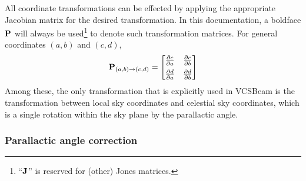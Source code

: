 \documentclass{book}
\newcommand{\vcsbeam}{{\sc VCSBeam}}
\newcommand{\pd}[2]{\ensuremath{\frac{\partial #1}{\partial #2}}}
\newcommand{\transmat}[4]{\ensuremath{{\bf P}_{(#1,#2)\rightarrow(#3,#4)}}}
\begin{document}
All coordinate transformations can be effected by applying the appropriate Jacobian matrix for the desired transformation.
In this documentation, a boldface ${\bf P}$ will always be used\footnote{``${\bf J}$'' is reserved for (other) Jones matrices.} to denote such transformation matrices.
For general coordinates $(a,b)$ and $(c,d)$,
\begin{equation}
    \transmat{a}{b}{c}{d} =
    \begin{bmatrix}
        \pd{c}{a} & \pd{c}{b} \\[5 pt]
        \pd{d}{a} & \pd{d}{b}
    \end{bmatrix}
\end{equation}
Among these, the only transformation that is explicitly used in \vcsbeam{} is the transformation between local sky coordinates and celestial sky coordinates, which is a single rotation within the sky plane by the parallactic angle.

\subsubsection{Parallactic angle correction}
\end{document}
